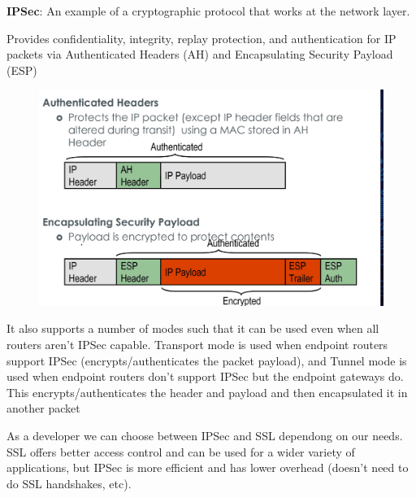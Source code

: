 \documentclass[../notes.tex]{subfiles}
\begin{document}
\begin{definition}
    \textbf{IPSec}: An example of a cryptographic protocol that works at the network layer.

    Provides confidentiality, integrity, replay protection, and authentication for IP packets via Authenticated Headers (AH) and Encapsulating Security Payload (ESP)

    \begin{figure}[H]
        \centering
        \includegraphics[width=0.8\linewidth]{img/image_2023-03-30-03-42-19.png}
    \end{figure}

    It also supports a number of modes such that it can be used even when all routers aren't IPSec capable.
    Transport mode is used when endpoint routers support IPSec (encrypts/authenticates the packet payload), and Tunnel mode is used when endpoint routers don't support IPSec but the endpoint gateways do. This encrypts/authenticates the header and payload and then encapsulated it in another packet
\end{definition}

As a developer we can choose between IPSec and SSL dependong on our needs. SSL offers better access control and can be used for a wider variety of applications, but IPSec is more efficient and has lower overhead (doesn't need to do SSL handshakes, etc).
\end{document}
